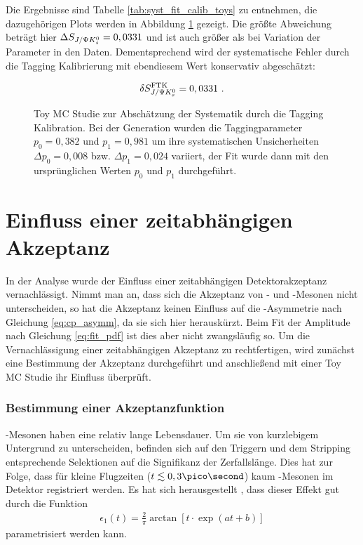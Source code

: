 Die Ergebnisse sind Tabelle \ref{tab:syst_fit_calib_toys} zu entnehmen, die dazugehörigen Plots werden in Abbildung \ref{fig:toys_tag_calib} gezeigt. Die größte Abweichung beträgt hier $\Delta S_{J/\Psi K_s^0} = 0,0331$ und ist auch größer als bei Variation der Parameter in den Daten. Dementsprechend wird der systematische Fehler durch die Tagging Kalibrierung mit ebendiesem Wert konservativ abgeschätzt:

\begin{align}
\delta S_{J/\Psi K_s^0}^{\text{FTK}} = 0,0331\ .
\end{align}

\begin{figure}[hptb]
\centering
{}
\caption{Toy MC Studie zur Abschätzung der Systematik durch die Tagging Kalibration. Bei der Generation wurden die Taggingparameter $p_0=0,382$ und $p_1=0,981$ um ihre systematischen Unsicherheiten $\Delta p_0 = 0,008$ bzw. $\Delta p_1 = 0,024$ variiert, der Fit wurde dann mit den ursprünglichen Werten $p_0$ und $p_1$ durchgeführt.}
\label{fig:toys_tag_calib}
\end{figure}


\section{Einfluss einer zeitabhängigen Akzeptanz} \label{kap:akzeptanz}
In der Analyse wurde der Einfluss einer zeitabhängigen Detektorakzeptanz vernachlässigt. Nimmt man an, dass sich die Akzeptanz von \Bd- und \Bdbar-Mesonen nicht unterscheiden, so hat die Akzeptanz keinen Einfluss auf die \CP-Asymmetrie nach Gleichung \ref{eq:cp_asymm}, da sie sich hier herauskürzt. Beim Fit der Amplitude nach Gleichung \ref{eq:fit_pdf} ist dies aber nicht zwangsläufig so. Um die Vernachlässigung einer zeitabhängigen Akzeptanz zu rechtfertigen, wird zunächst eine Bestimmung der Akzeptanz durchgeführt und anschließend mit einer Toy MC Studie ihr Einfluss überprüft.

\subsubsection{Bestimmung einer Akzeptanzfunktion} 
\Bd-Mesonen haben eine relativ lange Lebensdauer. Um sie von kurzlebigem Untergrund zu unterscheiden, befinden sich auf den Triggern und dem Stripping entsprechende Selektionen auf die Signifikanz der Zerfallslänge. Dies hat zur Folge, dass für kleine Flugzeiten ($t \lesssim 0,3\pico\second$) kaum \Bd-Mesonen im Detektor registriert werden. Es hat sich herausgestellt \cite{lhcb-paper}, dass dieser Effekt gut durch die Funktion
\begin{align}
\epsilon_1(t) = \frac{2}{\pi}\arctan[t\cdot \exp(at+b)]
\end{align}
parametrisiert werden kann.

